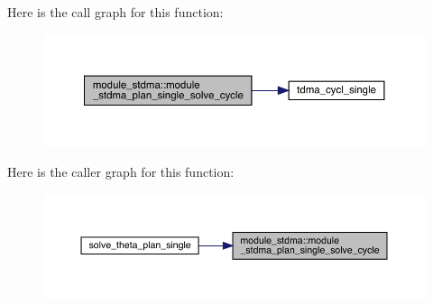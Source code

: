Here is the call graph for this function\+:\nopagebreak
\begin{figure}[H]
\begin{center}
\leavevmode
\includegraphics[width=350pt]{namespacemodule__stdma_ae0554602dc9cb19da09c0555f12e1312_cgraph}
\end{center}
\end{figure}
Here is the caller graph for this function\+:\nopagebreak
\begin{figure}[H]
\begin{center}
\leavevmode
\includegraphics[width=350pt]{namespacemodule__stdma_ae0554602dc9cb19da09c0555f12e1312_icgraph}
\end{center}
\end{figure}
